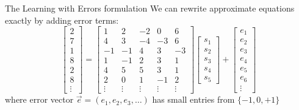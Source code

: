\documentclass[aspectratio=169, lualatex, handout]{beamer}
\begin{document}
\begin{frame}{The Learning with Errors formulation}
	We can rewrite approximate equations exactly by adding error terms:
	\[
		\begin{bmatrix}
			2 \\ 7 \\ 1 \\ 8 \\ 2 \\ 8 \\ \vdots
		\end{bmatrix}
		=
		\begin{bmatrix}
			1      & 2      & -2     & 0      & 6      \\
			4      & 3      & -4     & -3     & 6      \\
			-1     & -1     & 4      & 3      & -3     \\
			1      & -1     & 2      & 3      & 1      \\
			4      & 5      & 5      & 3      & 1      \\
			2      & 0      & 1      & -1     & 2      \\
			\vdots & \vdots & \vdots & \vdots & \vdots
		\end{bmatrix}
		\begin{bmatrix}
			s_1 \\ s_2 \\ s_3 \\ s_4 \\ s_5
		\end{bmatrix}
		+
		\begin{bmatrix}
			e_1 \\ e_2 \\ e_3 \\ e_4 \\ e_5 \\ e_6 \\ \vdots
		\end{bmatrix}
	\]
	where error vector $\vec{e} = (e_1, e_2, e_3, \ldots)$ has small entries from $\{-1, 0, +1\}$
\end{frame}
\end{document}
